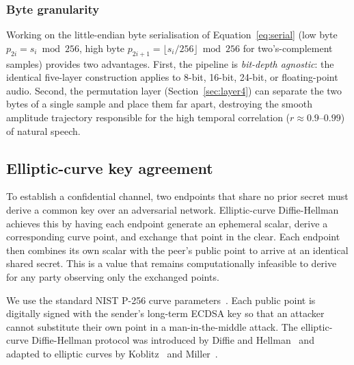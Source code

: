 \documentclass[pdflatex,sn-mathphys-num]{sn-jnl}%
\theoremstyle{thmstyleone}%
\theoremstyle{thmstyletwo}%
\theoremstyle{thmstylethree}%
\begin{document}
\subsubsection{Byte granularity}
Working on the little-endian byte serialisation of Equation~\eqref{eq:serial} (low byte $p_{2i}=s_i \bmod 256$, high byte $p_{2i+1}=\lfloor s_i/256\rfloor \bmod 256$ for two's-complement samples) provides two advantages. First, the pipeline is \emph{bit-depth agnostic}: the identical five-layer construction applies to 8-bit, 16-bit, 24-bit, or floating-point audio. Second, the permutation layer (Section~\ref{sec:layer4}) can separate the two bytes of a single sample and place them far apart, destroying the smooth amplitude trajectory responsible for the high temporal correlation ($r\approx0.9$--$0.99$) of natural speech.

\subsection{Elliptic-curve key agreement}
\label{sec:ecdh}
To establish a confidential channel, two endpoints that share no prior secret must derive a common key over an adversarial network. Elliptic-curve Diffie-Hellman achieves this by having each endpoint generate an ephemeral scalar, derive a corresponding curve point, and exchange that point in the clear. Each endpoint then combines its own scalar with the peer's public point to arrive at an identical shared secret. This is a value that remains computationally infeasible to derive for any party observing only the exchanged points. 

We use the standard NIST P-256 curve parameters~\cite{hankerson2004}. Each public point is digitally signed with the sender's long-term ECDSA key so that an attacker cannot substitute their own point in a man-in-the-middle attack. The elliptic-curve Diffie-Hellman protocol was introduced by Diffie and Hellman~\cite{diffie1976} and adapted to elliptic curves by Koblitz~\cite{koblitz1987} and Miller~\cite{miller1986}.
\end{document}
